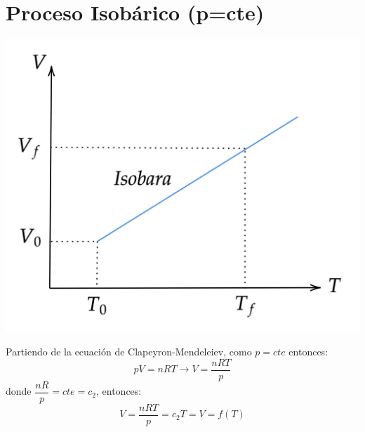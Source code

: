 \documentclass[../main]{subfiles}
\begin{document}
\section{Proceso Isobárico (p=cte)}
\begin{minipage}{0.5\textwidth}
    \includegraphics[scale=0.24]{Termodinámica/images/isobara.png}
\end{minipage}
\begin{minipage}{0.5\textwidth}
    Partiendo de la ecuación de Clapeyron-Mendeleiev, como $p=cte$ entonces:
    \begin{equation*}
        pV=nRT \rightarrow V=\dfrac{nRT}{p}
    \end{equation*}
    donde $\dfrac{nR}{p}=cte=c_2$, entonces:
    \begin{equation*}
        V=\dfrac{nRT}{p}=c_2 T=V=f(T)
    \end{equation*}
\end{minipage}
\end{document}
